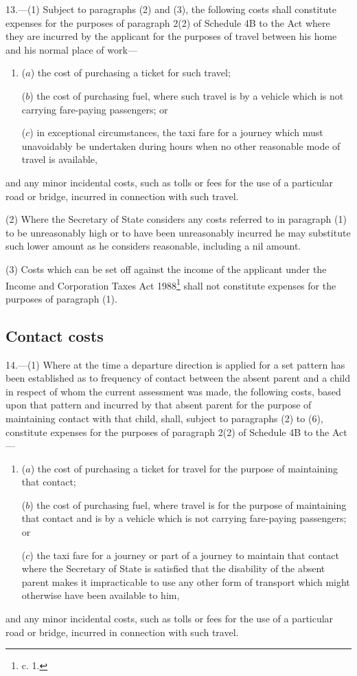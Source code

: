 \documentclass[a4paper]{article}
\begin{document}
13.—(1) Subject to
paragraphs (2) and (3), the following costs shall constitute expenses for the
purposes of paragraph 2(2) of Schedule 4B to the Act where they are incurred by
the applicant for the purposes of travel between his home and his normal place
of work—
\begin{enumerate}\item[]
($a$) the cost of purchasing a ticket for such travel;

($b$) the cost of purchasing fuel, where such travel is by a vehicle which is not
carrying fare-paying passengers; or

($c$) in exceptional circumstances, the taxi fare for a journey which must
unavoidably be undertaken during hours when no other reasonable mode of travel
is available,
\end{enumerate}
and any minor incidental costs, such as tolls or fees for the use of a
particular road or bridge, incurred in connection with such travel.

(2) Where the Secretary of State considers any costs referred to in paragraph
(1) to be unreasonably high or to have been unreasonably incurred he may
substitute such lower amount as he considers reasonable, including a nil amount.

(3) Costs which can be set off against the income of the applicant under the
Income and Corporation Taxes Act 1988\footnote{ c. 1.} shall not constitute expenses for the
purposes of paragraph (1).

\subsection[14. Contact costs]{Contact costs}

14.—(1) Where at the time a departure direction is applied for a
set pattern has been established as to frequency of contact between the absent
parent and a child in respect of whom the current assessment was made, the
following costs, based upon that pattern and incurred by that absent parent for
the purpose of maintaining contact with that child, shall, subject to paragraphs
(2) to (6), constitute expenses for the purposes of paragraph 2(2) of Schedule
4B to the Act—
\begin{enumerate}\item[]
($a$) the cost of purchasing a ticket for travel for the purpose of maintaining
that contact;

($b$) the cost of purchasing fuel, where travel is for the purpose of maintaining
that contact and is by a vehicle which is not carrying fare-paying passengers;
or

($c$) the taxi fare for a journey or part of a journey to maintain that contact
where the Secretary of State is satisfied that the disability of the absent
parent makes it impracticable to use any other form of transport which might
otherwise have been available to him,
\end{enumerate}
and any minor incidental costs, such as tolls or fees for the use of a
particular road or bridge, incurred in connection with such travel.
\end{document}
